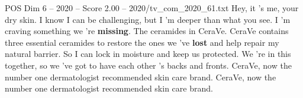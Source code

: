 \begin{textsample}{POS Dim 6 – 2020 – Score 2.00 – 2020/tv\_com\_2020\_61.txt}  \label{ex:f6_pos_043}
Hey, it 's me, your dry skin.
I know I can be challenging, but I 'm deeper than what you see.
I 'm craving something we 're \textbf{missing}.
The ceramides in CeraVe.
CeraVe contains three essential ceramides to restore the ones we 've \textbf{lost} and help repair my natural barrier.
So I can lock in moisture and keep us protected.
We 're in this together, so we 've got to have each other 's backs and fronts.
CeraVe, now the number one dermatologist recommended skin care brand.
CeraVe, now the number one dermatologist recommended skin care brand.

\end{textsample}
